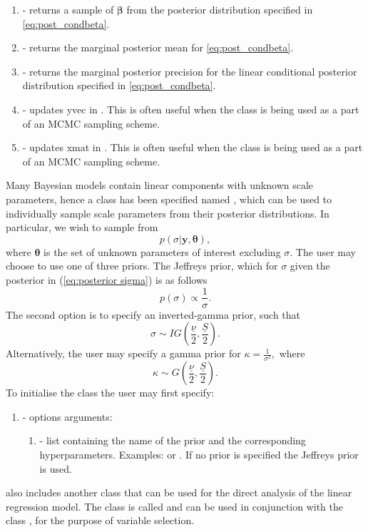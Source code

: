 \documentclass[article]{jss}
\begin{document}
\begin{enumerate}

\item {} - returns a sample of $\bm{\beta}$ from the posterior
distribution specified in \ref{eq:post_condbeta}.
\item {} - returns the marginal posterior
  mean for \ref{eq:post_condbeta}.
\item {} - returns the marginal posterior
  precision for the linear conditional posterior distribution specified in \ref{eq:post_condbeta}.
\item {} - updates yvec in . This
  is often useful when the class is being used as a part of an MCMC 
  sampling scheme.
\item {} - updates xmat in . This
  is often useful when the class is being used as a part of an MCMC 
  sampling scheme.
\end{enumerate}
Many Bayesian models contain linear components with unknown scale
parameters, hence a class has been specified named ,
which can be used to individually sample scale parameters from their
posterior distributions. In particular, we wish to sample from
\begin{equation} p(\sigma|\bm{y},\bm{\theta}),\label{eq:posterior
    sigma}
\end{equation} where $\bm{\theta}$ is the set of unknown
parameters of interest excluding $\sigma.$ The user may choose to use
one of three priors.  The Jeffreys prior, which for $\sigma$ given
the posterior in (\ref{eq:posterior sigma}) is as follows \[
p(\sigma)\propto\frac{1}{\sigma}.\] The second option is to specify an
inverted-gamma prior, such that\[ \sigma\sim
IG\left(\frac{\underline{\nu}}{2},\frac{\underline{S}}{2}\right).\]
Alternatively, the user may specify a gamma prior for
$\kappa=\frac{1}{\sigma^{2}},$ where\[ \kappa\sim
G\left(\frac{\underline{\nu}}{2},\frac{\underline{S}}{2}\right).\] To
initialise the class  the user may first
specify:
\begin{enumerate}
\item {} - options arguments:
\begin{enumerate}
\item {} - list containing the name of the prior and the
  corresponding hyperparameters. Examples:
   or . If no prior is specified the Jeffreys prior is used.
\end{enumerate}
\end{enumerate}
 also includes another class that can be used for the
direct analysis of the linear regression model. The class is called
 and can be used in conjunction with the
class , for the purpose of variable selection.
\end{document}
